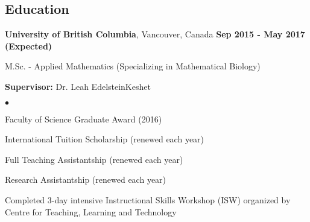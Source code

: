 \documentclass[margin,line]{res}
\newenvironment{list1}{
  \begin{list}{\ding{113}}{
      \setlength{\itemsep}{0in}
      \setlength{\parsep}{0in} \setlength{\parskip}{0in}
      \setlength{\topsep}{0in} \setlength{\partopsep}{0in} 
      \setlength{\leftmargin}{0.17in}}}{\end{list}}
\newenvironment{list2}{
  \begin{list}{$\bullet$}{
      \setlength{\itemsep}{0in}
      \setlength{\parsep}{0in} \setlength{\parskip}{0in}
      \setlength{\topsep}{0in} \setlength{\partopsep}{0in} 
      \setlength{\leftmargin}{0.2in}}}{\end{list}}
\newenvironment{list3}{
  \begin{list}{\textopenbullet}{
      \setlength{\itemsep}{0in}
      \setlength{\parsep}{0in} \setlength{\parskip}{0in}
      \setlength{\topsep}{0in} \setlength{\partopsep}{0in} 
      \setlength{\leftmargin}{0.1in}}}{\end{list}}
\begin{document}
\begin{resume}
\vspace*{.3cm}

\section{\sc Education}

{\bf University of British Columbia}, Vancouver, Canada  \hfill {\bf Sep 2015 - May 2017 (Expected)}\\
\vspace*{-.2cm}
\begin{list1}
\item[] M.Sc. - Applied Mathematics (Specializing in Mathematical Biology)
\vspace*{.1cm}
\item[] {\bf Supervisor:} Dr. Leah Edelstein{\textendash}Keshet
\begin{list2}
\vspace*{.1cm}
\setlength\itemsep{0.25em}
\item Faculty of Science Graduate Award (2016)
\item International Tuition Scholarship (renewed each year)
\item Full Teaching Assistantship (renewed each year)
\item Research Assistantship (renewed each year)
\begin{list3}
\vspace*{.1cm}
\item Completed 3-day intensive Instructional Skills Workshop (ISW) organized by Centre for Teaching, Learning and Technology
\end{list3}
\end{list2}
\end{list1}
\vspace*{.2cm}
 

\end{resume}
\end{document}
